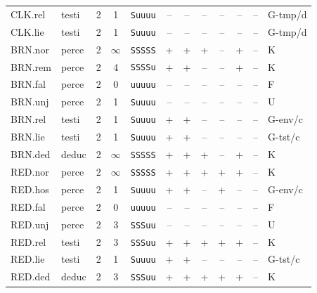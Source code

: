{\begin{longtable}{@{}llcccccccccl@{}}
CLK.rel & testi & 2 & 1 & \texttt{Suuuu} & \textsf{--} & \textsf{--} & \textsf{--} & \textsf{--} & \textsf{--} & -- & G-tmp/d \\
CLK.lie & testi & 2 & 1 & \texttt{Suuuu} & \textsf{--} & \textsf{--} & \textsf{--} & \textsf{--} & \textsf{--} & -- & G-tmp/d \\
BRN.nor & perce & 2 & $\infty$ & \texttt{SSSSS} & \textsf{+} & \textsf{+} & \textsf{+} & \textsf{--} & \textsf{+} & -- & K \\
BRN.rem & perce & 2 & 4 & \texttt{SSSSu} & \textsf{+} & \textsf{+} & \textsf{--} & \textsf{--} & \textsf{+} & -- & K \\
BRN.fal & perce & 2 & 0 & \texttt{uuuuu} & \textsf{--} & \textsf{--} & \textsf{--} & \textsf{--} & \textsf{--} & -- & F \\
BRN.unj & perce & 2 & 1 & \texttt{Suuuu} & \textsf{--} & \textsf{--} & \textsf{--} & \textsf{--} & \textsf{--} & -- & U \\
BRN.rel & testi & 2 & 1 & \texttt{Suuuu} & \textsf{+} & \textsf{+} & \textsf{--} & \textsf{--} & \textsf{--} & -- & G-env/c \\
BRN.lie & testi & 2 & 1 & \texttt{Suuuu} & \textsf{+} & \textsf{+} & \textsf{--} & \textsf{--} & \textsf{--} & -- & G-tst/c \\
BRN.ded & deduc & 2 & $\infty$ & \texttt{SSSSS} & \textsf{+} & \textsf{+} & \textsf{+} & \textsf{--} & \textsf{+} & -- & K \\
RED.nor & perce & 2 & $\infty$ & \texttt{SSSSS} & \textsf{+} & \textsf{+} & \textsf{+} & \textsf{+} & \textsf{+} & -- & K \\
RED.hos & perce & 2 & 1 & \texttt{Suuuu} & \textsf{+} & \textsf{+} & \textsf{--} & \textsf{+} & \textsf{--} & -- & G-env/c \\
RED.fal & perce & 2 & 0 & \texttt{uuuuu} & \textsf{--} & \textsf{--} & \textsf{--} & \textsf{--} & \textsf{--} & -- & F \\
RED.unj & perce & 2 & 3 & \texttt{SSSuu} & \textsf{--} & \textsf{--} & \textsf{--} & \textsf{--} & \textsf{--} & -- & U \\
RED.rel & testi & 2 & 3 & \texttt{SSSuu} & \textsf{+} & \textsf{+} & \textsf{+} & \textsf{+} & \textsf{+} & -- & K \\
RED.lie & testi & 2 & 1 & \texttt{Suuuu} & \textsf{+} & \textsf{+} & \textsf{--} & \textsf{--} & \textsf{--} & -- & G-tst/c \\
RED.ded & deduc & 2 & 3 & \texttt{SSSuu} & \textsf{+} & \textsf{+} & \textsf{+} & \textsf{+} & \textsf{+} & -- & K \\

\end{longtable}}
